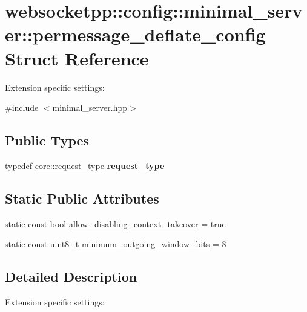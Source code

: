 \hypertarget{structwebsocketpp_1_1config_1_1minimal__server_1_1permessage__deflate__config}{}\section{websocketpp\+:\+:config\+:\+:minimal\+\_\+server\+:\+:permessage\+\_\+deflate\+\_\+config Struct Reference}
\label{structwebsocketpp_1_1config_1_1minimal__server_1_1permessage__deflate__config}


Extension specific settings\+:  




{\ttfamily \#include $<$minimal\+\_\+server.\+hpp$>$}

\subsection*{Public Types}
\begin{DoxyCompactItemize}
\item 
typedef \hyperlink{classwebsocketpp_1_1http_1_1parser_1_1request}{core\+::request\+\_\+type} {\bfseries request\+\_\+type}\hypertarget{structwebsocketpp_1_1config_1_1minimal__server_1_1permessage__deflate__config_a3011304a1e8bf6893f946bfd41e967f6}{}\label{structwebsocketpp_1_1config_1_1minimal__server_1_1permessage__deflate__config_a3011304a1e8bf6893f946bfd41e967f6}

\end{DoxyCompactItemize}
\subsection*{Static Public Attributes}
\begin{DoxyCompactItemize}
\item 
static const bool \hyperlink{structwebsocketpp_1_1config_1_1minimal__server_1_1permessage__deflate__config_a6e01239ebe19410d4214db6bd1b83d53}{allow\+\_\+disabling\+\_\+context\+\_\+takeover} = true
\item 
static const uint8\+\_\+t \hyperlink{structwebsocketpp_1_1config_1_1minimal__server_1_1permessage__deflate__config_a6faed3e781638f77c451d003578d5ca2}{minimum\+\_\+outgoing\+\_\+window\+\_\+bits} = 8
\end{DoxyCompactItemize}


\subsection{Detailed Description}
Extension specific settings\+: 

